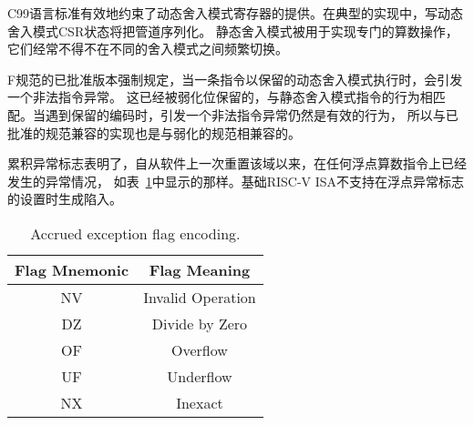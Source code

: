 \begin{commentary}
  C99语言标准有效地约束了动态舍入模式寄存器的提供。在典型的实现中，写动态舍入模式CSR状态将把管道序列化。
  静态舍入模式被用于实现专门的算数操作，它们经常不得不在不同的舍入模式之间频繁切换。

F规范的已批准版本强制规定，当一条指令以保留的动态舍入模式执行时，会引发一个非法指令异常。
这已经被弱化位保留的，与静态舍入模式指令的行为相匹配。当遇到保留的编码时，引发一个非法指令异常仍然是有效的行为，
所以与已批准的规范兼容的实现也是与弱化的规范相兼容的。
\end{commentary}
 
累积异常标志表明了，自从软件上一次重置该域以来，在任何浮点算数指令上已经发生的异常情况，
如表~\ref{bitdef}中显示的那样。基础RISC-V ISA不支持在浮点异常标志的设置时生成陷入。

\begin{table}[htp]
\begin{small}
\begin{center}
\begin{tabular}{cl}
\hline
\multicolumn{1}{|c|}{Flag Mnemonic} &
\multicolumn{1}{c|}{Flag Meaning} \\
\hline
\multicolumn{1}{|c|}{NV} &
\multicolumn{1}{c|}{Invalid Operation}\\
\hline
\multicolumn{1}{|c|}{DZ} &
\multicolumn{1}{c|}{Divide by Zero}\\
\hline
\multicolumn{1}{|c|}{OF} &
\multicolumn{1}{c|}{Overflow}\\
\hline
\multicolumn{1}{|c|}{UF} &
\multicolumn{1}{c|}{Underflow}\\
\hline
\multicolumn{1}{|c|}{NX} &
\multicolumn{1}{c|}{Inexact}\\
\hline
\end{tabular}
\end{center}
\end{small}
\caption{Accrued exception flag encoding.}
\label{bitdef}
\end{table}

